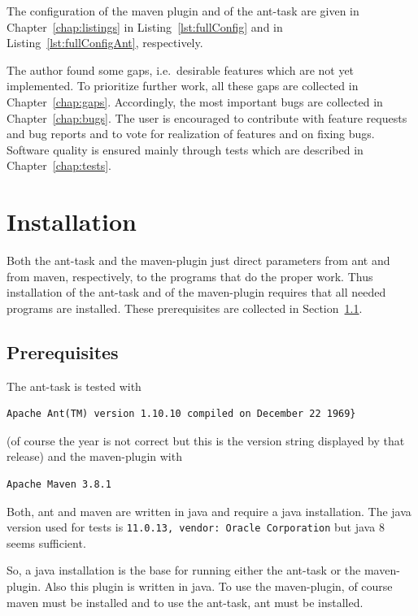 \documentclass[12pt]{book}
\renewcommand{\index}[1]{ }
\begin{document}
The configuration of the maven plugin and of the ant-task 
are given in Chapter~\ref{chap:listings}
in Listing~\ref{lst:fullConfig} and in Listing~\ref{lst:fullConfigAnt},
respectively. 

The author found some gaps, i.e.~desirable features 
which are not yet implemented. 
To prioritize further work, 
all these gaps are collected in Chapter~\ref{chap:gaps}. 
Accordingly, the most important bugs are collected in
Chapter~\ref{chap:bugs}. 
The user is encouraged to contribute with feature requests 
and bug reports and to vote for realization of features 
and on fixing bugs. 
Software quality is ensured mainly through tests 
which are described in Chapter~\ref{chap:tests}. 


\chapter{Installation}\label{chap:install}

Both the ant-task and the maven-plugin just direct parameters 
from ant and from maven, respectively, 
to the programs that do the proper work. 
Thus installation of the ant-task and of the maven-plugin 
requires that all needed programs are installed. 
These prerequisites are collected in Section~\ref{sec:prerequisites}. 
\index{ant-task}

\section{Prerequisites}\label{sec:prerequisites}

The ant-task is tested with \index{ant}
%
\begin{verbatim}
Apache Ant(TM) version 1.10.10 compiled on December 22 1969}
\end{verbatim}
%
(of course the year is not correct but this is the version string
displayed by that release) and the maven-plugin with 
%
\index{maven}
\begin{verbatim}
Apache Maven 3.8.1 
\end{verbatim}
%
Both, ant and maven are written in java and require a java installation. 
The java\index{java} version used for tests 
is \texttt{11.0.13, vendor: Oracle Corporation}
but java 8 seems sufficient. 


So, a java installation is the base for running either the ant-task 
or the maven-plugin. 
Also this plugin is written in java. 
To use the maven-plugin, of course maven must be installed 
and to use the ant-task, ant must be installed. 
\end{document}

